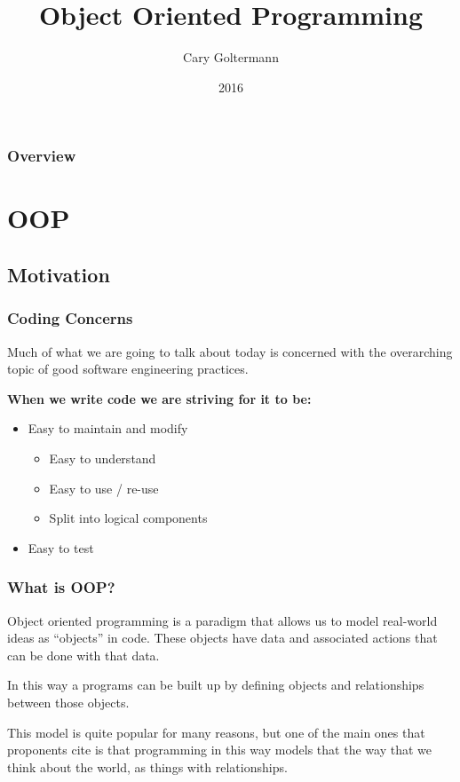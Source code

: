 \documentclass{beamer}
\title{Object Oriented Programming}
\author{Cary Goltermann}
\institute{Galvanize}
\date{2016}
\begin{document}
\frame{\titlepage}

\begin{frame}
  \frametitle{Overview}
  \tableofcontents[]
\end{frame}

\section{OOP}
\subsection{Motivation}
\begin{frame}
  \frametitle{Coding Concerns}
  Much of what we are going to talk about today is concerned with the overarching topic of good software engineering practices. \vspace{4mm}

  \textbf{When we write code we are striving for it to be:}

  \vspace{4mm}
  \begin{itemize}
    \item Easy to maintain and modify
    \begin{itemize}
      \item Easy to understand
      \item Easy to use / re-use
      \item Split into logical components
    \end{itemize}
    \item Easy to test
  \end{itemize}
\end{frame}

\begin{frame}
  \frametitle{What is OOP?}
  Object oriented programming is a paradigm that allows us to model real-world ideas as ``objects'' in code. These objects have data and associated actions that can be done with that data. \vspace{4mm}
  \pause

  In this way a programs can be built up by defining objects and relationships between those objects. \vspace{4mm}
  \pause

    This model is quite popular for many reasons, but one of the main ones that proponents cite is that programming in this way models that the way that we think about the world, as things with relationships.
\end{frame}
\end{document}
